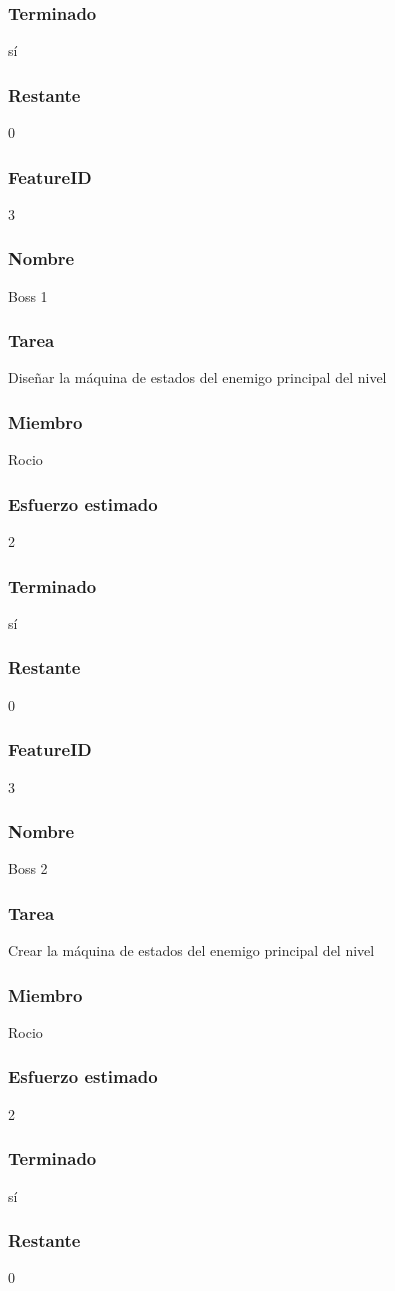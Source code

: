 \subsubsection{Terminado} sí
\subsubsection{Restante} 0

\subsubsection{FeatureID} 3
\subsubsection{Nombre} Boss 1
\subsubsection{Tarea} Diseñar la máquina de estados del enemigo principal del nivel
\subsubsection{Miembro} Rocio
\subsubsection{Esfuerzo estimado} 2
\subsubsection{Terminado} sí
\subsubsection{Restante} 0

\subsubsection{FeatureID} 3
\subsubsection{Nombre} Boss 2
\subsubsection{Tarea} Crear la máquina de estados del enemigo principal del nivel
\subsubsection{Miembro} Rocio
\subsubsection{Esfuerzo estimado} 2
\subsubsection{Terminado} sí
\subsubsection{Restante} 0

